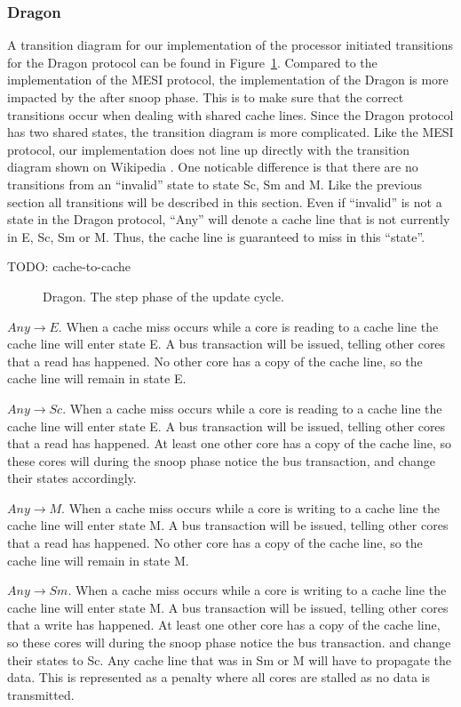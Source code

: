 \subsubsection{Dragon}
A transition diagram for our implementation of the processor initiated transitions for the Dragon protocol can be found in Figure~\ref{fig:dragon}.
Compared to the implementation of the MESI protocol, the implementation of the Dragon is more impacted by the after snoop phase.
This is to make sure that the correct transitions occur when dealing with shared cache lines.
Since the Dragon protocol has two shared states, the transition diagram is more complicated.
Like the MESI protocol, our implementation does not line up directly with the transition diagram shown on Wikipedia \cite{dragon_wiki}.
One noticable difference is that there are no transitions from an ``invalid'' state to state Sc, Sm and M.
Like the previous section all transitions will be described in this section.
Even if ``invalid'' is not a state in the Dragon protocol, ``Any'' will denote a cache line that is not currently in E, Sc, Sm or M.
Thus, the cache line is guaranteed to miss in this ``state''.

TODO: cache-to-cache

\begin{figure}[H]
    \centering
    \caption{Dragon. The step phase of the update cycle.}
    \label{fig:dragon}
\end{figure}

$Any \to E$.
When a cache miss occurs while a core is reading to a cache line the cache line will enter state E.
A bus transaction will be issued, telling other cores that a read has happened.
No other core has a copy of the cache line, so the cache line will remain in state E.

$Any \to Sc$.
When a cache miss occurs while a core is reading to a cache line the cache line will enter state E.
A bus transaction will be issued, telling other cores that a read has happened.
At least one other core has a copy of the cache line, so these cores will during the snoop phase notice the bus transaction, and change their states accordingly.

$Any \to M$.
When a cache miss occurs while a core is writing to a cache line the cache line will enter state M.
A bus transaction will be issued, telling other cores that a read has happened.
No other core has a copy of the cache line, so the cache line will remain in state M.

$Any \to Sm$.
When a cache miss occurs while a core is writing to a cache line the cache line will enter state M.
A bus transaction will be issued, telling other cores that a write has happened.
At least one other core has a copy of the cache line, so these cores will during the snoop phase notice the bus transaction.
and change their states to Sc.
Any cache line that was in Sm or M will have to propagate the data.
This is represented as a penalty where all cores are stalled as no data is transmitted.

